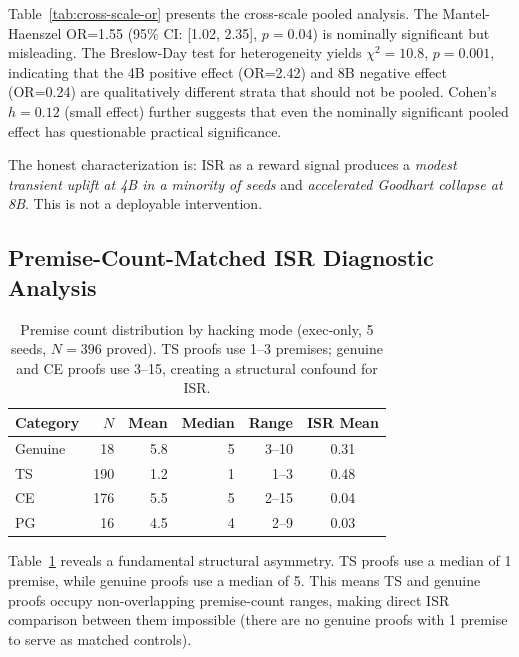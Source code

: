\documentclass[11pt,a4paper]{article}
\begin{document}
Table~\ref{tab:cross-scale-or} presents the cross-scale pooled analysis.
The Mantel-Haenszel OR=1.55 (95\% CI: [1.02, 2.35], $p=0.04$) is nominally significant but misleading.
The Breslow-Day test for heterogeneity yields $\chi^2=10.8$, $p=0.001$, indicating that the 4B positive effect (OR=2.42) and 8B negative effect (OR=0.24) are qualitatively different strata that should not be pooled.
Cohen's $h=0.12$ (small effect) further suggests that even the nominally significant pooled effect has questionable practical significance.

The honest characterization is: ISR as a reward signal produces a \emph{modest transient uplift at 4B in a minority of seeds} and \emph{accelerated Goodhart collapse at 8B}.
This is not a deployable intervention.

\subsection{Premise-Count-Matched ISR Diagnostic Analysis}
\label{sec:premise-matched}

\begin{table}[t]
\centering
\caption{Premise count distribution by hacking mode (exec-only, 5 seeds, $N{=}396$ proved). TS proofs use 1--3 premises; genuine and CE proofs use 3--15, creating a structural confound for ISR.}
\label{tab:premise-count}
\small
\begin{tabular}{lrrrrc}
\toprule
Category & $N$ & Mean & Median & Range & ISR Mean \\
\midrule
Genuine & 18 & 5.8 & 5 & 3--10 & 0.31 \\
TS & 190 & 1.2 & 1 & 1--3 & 0.48 \\
CE & 176 & 5.5 & 5 & 2--15 & 0.04 \\
PG & 16 & 4.5 & 4 & 2--9 & 0.03 \\
\bottomrule
\end{tabular}
\end{table}

Table~\ref{tab:premise-count} reveals a fundamental structural asymmetry.
TS proofs use a median of 1 premise, while genuine proofs use a median of 5.
This means TS and genuine proofs occupy non-overlapping premise-count ranges, making direct ISR comparison between them impossible (there are no genuine proofs with 1 premise to serve as matched controls).
\end{document}
